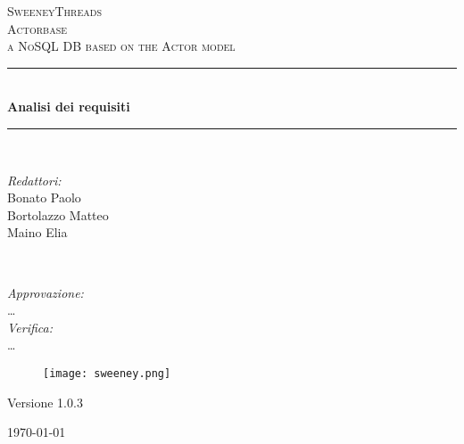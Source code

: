 \documentclass[a4paper]{report}
\begin{document}
	
	\begin{titlepage}
		\newcommand{\HRule}{\rule{\linewidth}{0.5mm}} 
		\center  
		
		\textsc{\LARGE SweeneyThreads}\\[1.5cm] 
		\textsc{\Large Actorbase}\\[0.5cm] 
		\textsc{\large a NoSQL DB based on the Actor model}\\[0.5cm]
		
		
		\HRule \\[0.4cm]
		{ \huge \bfseries Analisi dei requisiti}\\[0.4cm] 
		\HRule \\[1.5cm]
		
		\begin{minipage}{0.4\textwidth}
			\begin{flushleft} \large
				\emph{Redattori:}\\
				Bonato Paolo \\
				Bortolazzo Matteo \\
				Maino Elia
			\end{flushleft}
		\end{minipage}
		~
		\begin{minipage}{0.4\textwidth}
			\begin{flushright} \large
				\emph{Approvazione:} \\
				\dots \\
				\emph{Verifica:} \\
				\dots
			\end{flushright}
		\end{minipage}
		
		\begin{figure}[H]
			\centering
			\texttt{[image: sweeney.png]}
		\end{figure}
		\begin{center}
			Versione 1.0.3
		\end{center}
		{\large \today}\\[3cm] 
		\vfill  
	\end{titlepage}
	
	
	\tableofcontents
	
\end{document}
